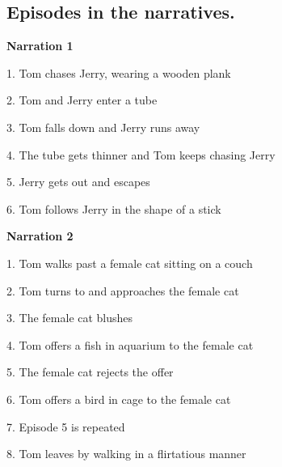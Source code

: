 \clearpage



\begin{appendix}
\setlength{\columnsep}{12pt}
\twocolumn
\linespread{1}

\hypertarget{episodes-in-the-narratives.}{%
\section{Episodes in the
narratives.}\label{episodes-in-the-narratives.}}

\justifying
\small

\textbf{Narration 1} \vspace{-0.3cm}

1. Tom chases Jerry, wearing a wooden plank \vspace{-0.3cm}

2. Tom and Jerry enter a tube \vspace{-0.3cm}

3. Tom falls down and Jerry runs away \vspace{-0.3cm}

4. The tube gets thinner and Tom keeps chasing Jerry \vspace{-0.3cm}

5. Jerry gets out and escapes \vspace{-0.3cm}

6. Tom follows Jerry in the shape of a stick

\textbf{Narration 2} \vspace{-0.3cm}

1. Tom walks past a female cat sitting on a couch \vspace{-0.3cm}

2. Tom turns to and approaches the female cat \vspace{-0.3cm}

3. The female cat blushes \vspace{-0.3cm}

4. Tom offers a fish in aquarium to the female cat \vspace{-0.3cm}

5. The female cat rejects the offer \vspace{-0.3cm}

6. Tom offers a bird in cage to the female cat \vspace{-0.3cm}

7. Episode 5 is repeated \vspace{-0.3cm}

8. Tom leaves by walking in a flirtatious manner


\end{appendix}
